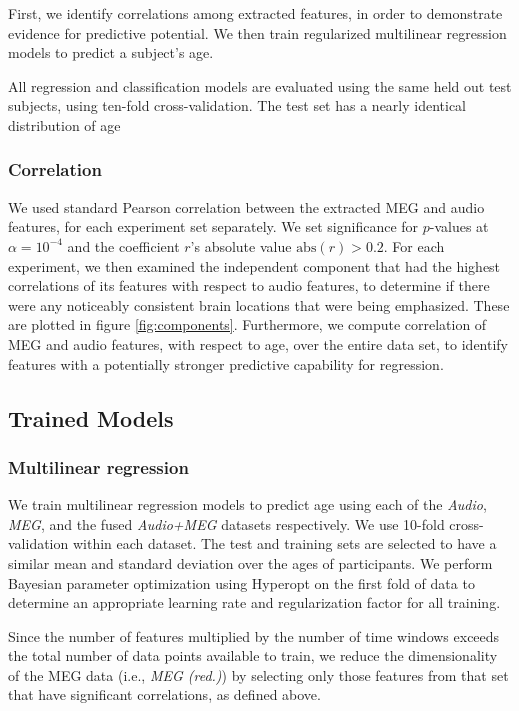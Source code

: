 \documentclass[utf8]{frontiersSCNS} %
\begin{document}
First, we identify correlations among extracted features, in order to demonstrate evidence for predictive potential. We then train regularized multilinear regression models to predict a subject's age.

All regression and classification models are evaluated using the same held out test subjects, using ten-fold cross-validation. The test set has a nearly identical distribution of age

\subsubsection{Correlation}

We used standard Pearson correlation between the extracted MEG and audio features, for each experiment set separately. We set significance for $p$-values at $\alpha = 10^{-4}$ and the coefficient $r$'s absolute value $\text{abs}(r) > 0.2$. For each experiment, we then examined the independent component that had the highest correlations of its features with respect to audio features, to determine if there were any noticeably consistent brain locations that were being emphasized. These are plotted in figure \ref{fig:components}. Furthermore, we compute correlation of MEG and audio features, with respect to age, over the entire data set, to identify features with a potentially stronger predictive capability for regression.

\subsection{Trained Models}

\subsubsection{Multilinear regression}

We train multilinear regression models to predict age using each of the \textit{Audio}, \textit{MEG}, and the fused \textit{Audio+MEG} datasets respectively. We use 10-fold cross-validation within each dataset. The test and training sets are selected to have a similar mean and standard deviation over the ages of participants. We perform Bayesian parameter optimization using Hyperopt \cite{Bergstra2013} on the first fold of data to determine an appropriate learning rate and regularization factor for all training.

Since the number of features multiplied by the number of time windows exceeds the total number of data points available to train, we reduce the dimensionality of the MEG data (i.e., {\em MEG (red.)}) by selecting only those features from that set that have significant correlations, as defined above.
\end{document}
